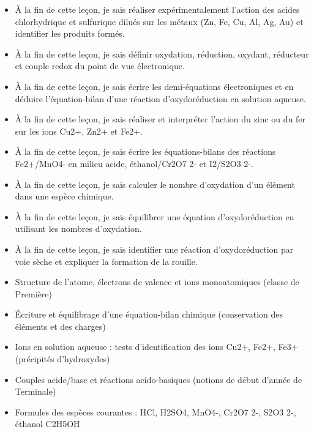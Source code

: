 \documentclass[11pt]{article}
\begin{document}
\begin{objectifs}
\begin{itemize}
\item À la fin de cette leçon, je sais réaliser expérimentalement l'action des acides chlorhydrique et sulfurique dilués sur les métaux (Zn, Fe, Cu, Al, Ag, Au) et identifier les produits formés.
\item À la fin de cette leçon, je sais définir oxydation, réduction, oxydant, réducteur et couple redox du point de vue électronique.
\item À la fin de cette leçon, je sais écrire les demi-équations électroniques et en déduire l'équation-bilan d'une réaction d'oxydoréduction en solution aqueuse.
\item À la fin de cette leçon, je sais réaliser et interpréter l'action du zinc ou du fer sur les ions Cu2+, Zn2+ et Fe2+.
\item À la fin de cette leçon, je sais écrire les équations-bilans des réactions Fe2+/MnO4- en milieu acide, éthanol/Cr2O7 2- et I2/S2O3 2-.
\item À la fin de cette leçon, je sais calculer le nombre d'oxydation d'un élément dans une espèce chimique.
\item À la fin de cette leçon, je sais équilibrer une équation d'oxydoréduction en utilisant les nombres d'oxydation.
\item À la fin de cette leçon, je sais identifier une réaction d'oxydoréduction par voie sèche et expliquer la formation de la rouille.
\end{itemize}
\end{objectifs}

\begin{prerequis}
\begin{itemize}
\item Structure de l'atome, électrons de valence et ions monoatomiques (classe de Première)
\item Écriture et équilibrage d'une équation-bilan chimique (conservation des éléments et des charges)
\item Ions en solution aqueuse : tests d'identification des ions Cu2+, Fe2+, Fe3+ (précipités d'hydroxydes)
\item Couples acide/base et réactions acido-basiques (notions de début d'année de Terminale)
\item Formules des espèces courantes : HCl, H2SO4, MnO4-, Cr2O7 2-, S2O3 2-, éthanol C2H5OH
\end{itemize}
\end{prerequis}
\end{document}
